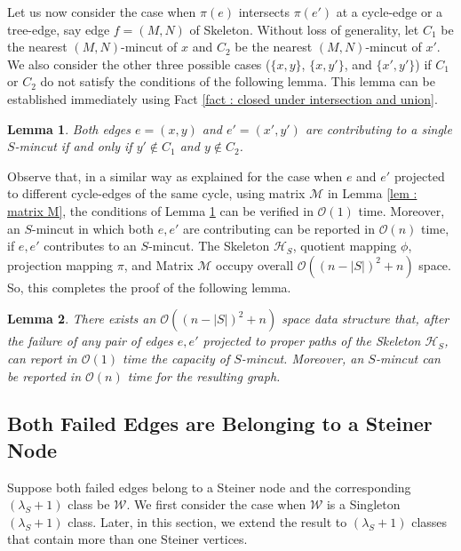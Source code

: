 \documentclass[letterpaper,11pt]{article}
\newtheorem{lemma}{Lemma}[]
\begin{document}
\noindent
Let us now consider the case when $\pi(e)$ intersects $\pi(e')$ at a cycle-edge or a tree-edge, say edge $f=(M,N)$ of Skeleton. Without loss of generality, let $C_1$ be the nearest $(M,N)$-mincut of $x$ and $C_2$  be the nearest $(M,N)$-mincut of $x'$.
We also consider the other three possible cases ($\{x,y\}$, $\{x,y'\}$, and $\{x',y'\}$) if $C_1$ or $C_2$ do not satisfy the conditions of the following lemma. This lemma can be established immediately using Fact \ref{fact : closed under intersection and union}.
\begin{lemma} \label{lem : single $S$-mincut}
    Both edges $e=(x,y)$ and $e'=(x',y')$ are contributing to a single $S$-mincut if and only if $y'\notin C_1$ and $y\notin C_2$.
\end{lemma}
Observe that, in a similar way as explained for the case when $e$ and $e'$ projected to different cycle-edges of the same cycle, using matrix ${\mathcal M}$ in Lemma \ref{lem : matrix M}, the conditions of Lemma \ref{lem : single $S$-mincut} can be verified in ${\mathcal O}(1)$ time. Moreover, an $S$-mincut in which both $e,e'$ are contributing can be reported in ${\mathcal O}(n)$ time, if $e,e'$ contributes to an $S$-mincut. The Skeleton ${\mathcal H}_S$, quotient mapping $\phi$, projection mapping $\pi$, and Matrix ${\mathcal M}$ occupy overall ${\mathcal O}((n-|S|)^2+n)$ space. So, this completes the proof of the following lemma.
\begin{lemma}  \label{lem : dual failure edges are projected to proper paths}
    There exists an ${\mathcal O}((n-|S|)^2+n)$ space data structure that, after the failure of any pair of edges $e,e'$ projected to proper paths of the Skeleton ${\mathcal H}_S$, can report in ${\mathcal O}(1)$ time the capacity of $S$-mincut. Moreover, an $S$-mincut can be reported in ${\mathcal O}(n)$ time for the resulting graph. 
\end{lemma}






\subsection{Both Failed Edges are Belonging to a Steiner Node} \label{sec : Steiner node}
Suppose both failed edges belong to a Steiner node and the corresponding $(\lambda_S+1)$ class be ${\mathcal W}$. We first consider the case when ${\mathcal W}$ is a Singleton $(\lambda_S+1)$ class. Later, in this section, we extend the result to $(\lambda_S+1)$ classes that contain more than one Steiner vertices.
\end{document}
